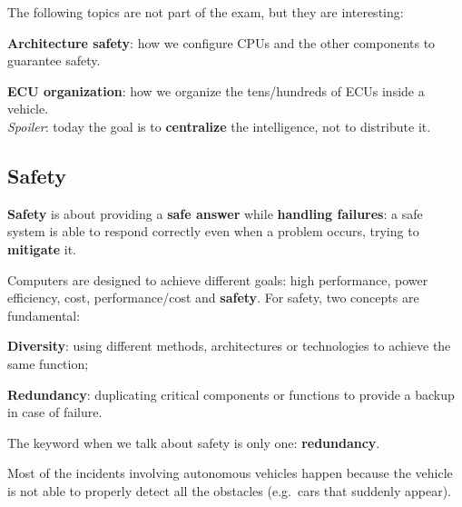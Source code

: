 \begin{infobox}
The following topics are not part of the exam, but they are interesting:
\begin{compactitemize}
    \item \textbf{Architecture safety}: how we configure CPUs and the other components to guarantee safety.
    \item \textbf{ECU organization}: how we organize the tens/hundreds of ECUs inside a vehicle. \\
          \textit{Spoiler}: today the goal is to \textbf{centralize} the intelligence, not to distribute it.
\end{compactitemize}
\end{infobox}


\subsection{Safety}
\textbf{Safety} is about providing a \textbf{safe answer} while \textbf{handling failures}: a safe system is able to respond correctly even when a problem occurs, trying to \textbf{mitigate} it.

Computers are designed to achieve different goals: high performance, power efficiency, cost, performance/cost and \textbf{safety}.
For safety, two concepts are fundamental:
\begin{compactitemize}
    \item \textbf{Diversity}: using different methods, architectures or technologies to achieve the same function;
    \item \textbf{Redundancy}: duplicating critical components or functions to provide a backup in case of failure.
\end{compactitemize}

The keyword when we talk about safety is only one: \textbf{redundancy}.

\begin{infobox}
Most of the incidents involving autonomous vehicles happen because the vehicle is not able to properly detect all the obstacles (e.g.\ cars that suddenly appear).
\end{infobox}

